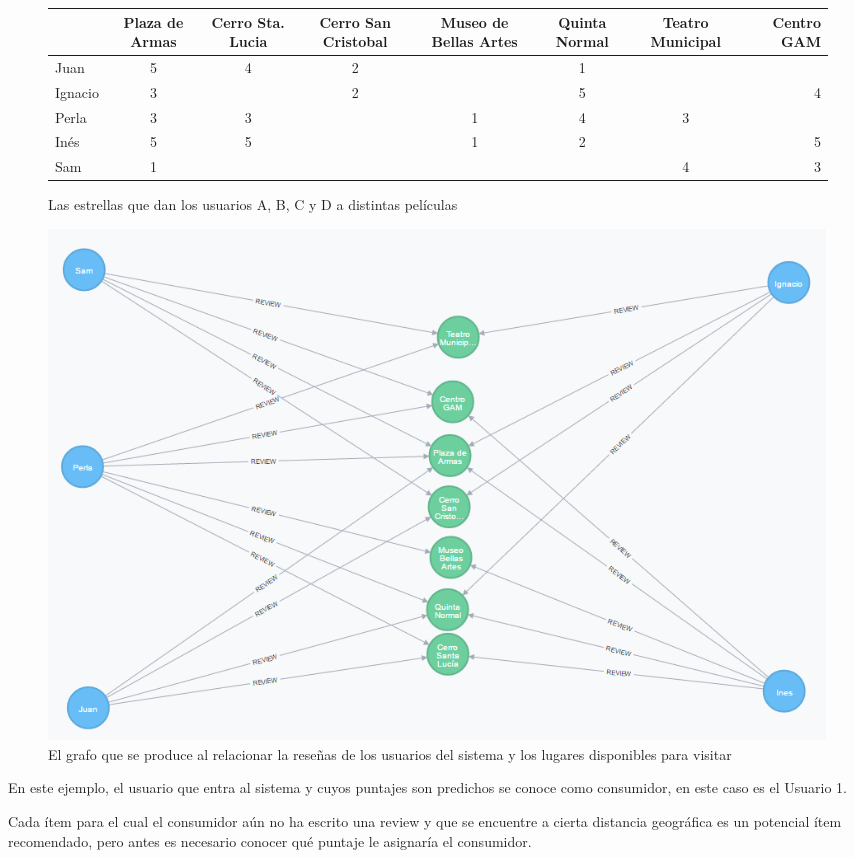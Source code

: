 \begin{figure}
\centering
\begin{adjustbox}{max width=\textwidth}
\begin{tabular}{l*{6}{c}r}
                  & Plaza de Armas & Cerro Sta. Lucia & Cerro San Cristobal & Museo de Bellas Artes & Quinta Normal  & Teatro Municipal & Centro GAM \\
\hline
Juan          & 5 & 4 & 2 &   & 1 &   &   \\
\hline
Ignacio       & 3 &   & 2 &   & 5 &   & 4 \\
\hline
Perla         & 3 & 3 &   & 1 & 4 & 3 &   \\
\hline
Inés          & 5 & 5 &   & 1 & 2 &   & 5 \\
\hline
Sam          & 1 &  &   &  &  & 4  & 3 \\


\end{tabular}
\end{adjustbox}
\caption{Las estrellas que dan los usuarios A, B, C y D a distintas películas} 

\end{figure}

\begin{figure}[hbtp]
\centering
\includegraphics[scale=0.8]{images/examplegraph.png}
\caption{El grafo que se produce al relacionar la reseñas de los usuarios del sistema y los lugares disponibles para visitar}
\end{figure}  

En este ejemplo, el usuario que entra al sistema y cuyos puntajes son predichos se conoce como consumidor, en este caso es el Usuario 1.

Cada ítem para el cual el consumidor aún no ha escrito una review y que se encuentre a cierta distancia geográfica es un potencial ítem recomendado, pero antes es necesario conocer qué puntaje le asignaría el consumidor.


